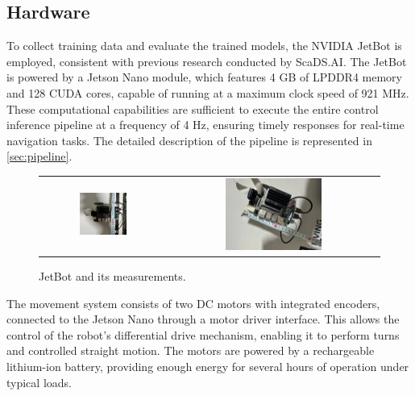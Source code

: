 \subsection{Hardware}

To collect training data and evaluate the trained models, the NVIDIA JetBot is employed, consistent with previous research conducted by ScaDS.AI. The JetBot is powered by a Jetson Nano module, which features 4 GB of LPDDR4 memory and 128 CUDA cores, capable of running at a maximum clock speed of 921 MHz. These computational capabilities are sufficient to execute the entire control inference pipeline at a frequency of 4 Hz, ensuring timely responses for real-time navigation tasks. The detailed description of the pipeline is represented in \autoref{sec:pipeline}.

\begin{figure}[htbp]
  \centering
  \tabulinesep=1.2mm
  \begin{tabu}{cc}
    \includegraphics[width=0.4\textwidth]{Images/JetBot/height.jpeg} & \includegraphics[width=0.474\textwidth]{Images/JetBot/width.jpeg} \\
  \end{tabu}
  \caption{JetBot and its measurements.}
  \label{fig:jetbot}
\end{figure}

The movement system consists of two DC motors with integrated encoders, connected to the Jetson Nano through a motor driver interface. This allows the control of the robot’s differential drive mechanism, enabling it to perform turns and controlled straight motion. The motors are powered by a rechargeable lithium-ion battery, providing enough energy for several hours of operation under typical loads.

